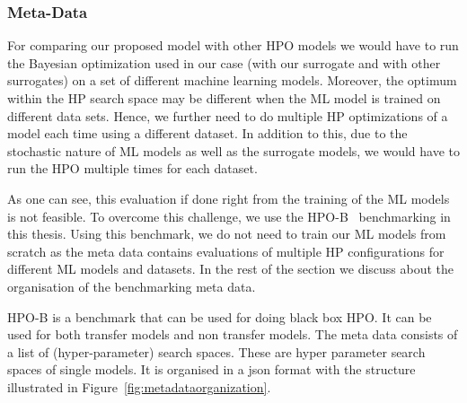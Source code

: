 \documentclass[12pt, twoside, ngerman]{report}
\begin{document}
\subsubsection{Meta-Data}

For comparing our proposed model with other HPO models we would have to run the Bayesian optimization used in our case (with our surrogate and with other surrogates) on a set of different machine learning models.
Moreover,  the optimum within the HP search space may be different when the ML model is trained on different data sets.
Hence, we further need to do multiple HP optimizations of a model each time using a different dataset.
In addition to this, due to the stochastic nature of ML models as well as the surrogate models, 
we would have to run the HPO multiple times for each dataset.

As one can see,  this evaluation if done right from the training of the ML models is not feasible.
To overcome this challenge,  we use the HPO-B~\cite{DBLP:journals/corr/abs-2106-06257} benchmarking in this thesis.
Using this benchmark,  we do not need to train our ML models from scratch as the meta data contains evaluations of multiple HP configurations for different ML models and datasets.
In the rest of the section we discuss about the organisation of the benchmarking meta data.


HPO-B is a benchmark that can be used for doing black box HPO.
It can be used for both transfer models and non transfer models.
The meta data consists of a list of (hyper-parameter) search spaces.
These are hyper parameter search spaces of single models.
It is organised in a json format with the structure illustrated in Figure~\ref{fig:metadataorganization}.
\end{document}
